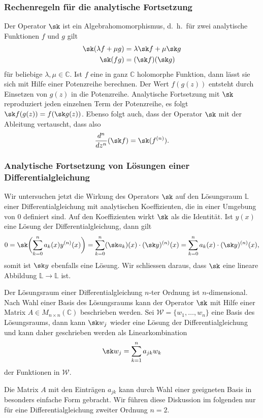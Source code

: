 \subsubsection{Rechenregeln für die analytische Fortsetzung}
Der Operator $\sk$ ist ein Algebrahomomorphismus, d.~h.~für zwei analytische
Funktionen $f$ und $g$ gilt
\[
\begin{aligned}
\sk(\lambda f + \mu g)
&=
\lambda \sk f  + \mu \sk g
\\
\sk(fg)
&=
(\sk f)(\sk g)
\end{aligned}
\]
für beliebige $\lambda,\mu\in\mathbb{C}$.
Ist $f$ eine in ganz $\mathbb{C}$ holomorphe Funktion, dann lässt sie
sich mit Hilfe einer Potenzreihe berechnen.
Der Wert $f(g(z))$ entsteht durch Einsetzen von $g(z)$ in die Potenzreihe.
Analytische Fortsetzung mit $\sk$ reproduziert jeden einzelnen Term
der Potenzreihe, es folgt
$\sk f(g(z)) = f(\sk g(z))$.
Ebenso folgt auch, dass der Operator $\sk$ mit der Ableitung
vertauscht, dass also
\[
\frac{d^n}{dz^n}(\sk f)
=
\sk(f^{(n)}).
\]


\subsubsection{Analytische Fortsetzung von Lösungen einer Differentialgleichung}
Wir untersuchen jetzt die Wirkung des Operators $\sk$ auf
den Lösungsraum $\mathbb{L}$ einer Differentialgleichung mit
analytischen Koeffizienten, die in einer Umgebung von $0$
definiert sind.
Auf den Koeffizienten wirkt $\sk$ als die Identität. 
Ist $y(x)$ eine Lösung der Differentialgleichung, dann gilt
\[
0
=
\sk\biggl(
\sum_{k=0}^n a_k(x) y^{(n)}(x)
\biggr)
=
\sum_{k=0}^n (\sk a_k)(x) \cdot (\sk y)^{(n)}(x)
=
\sum_{k=0}^n a_k(x) \cdot (\sk y)^{(n)}(x),
\]
somit ist $\sk y$ ebenfalls eine Lösung.
Wir schliessen daraus, dass $\sk$ eine lineare Abbildung 
$\mathbb{L}\to\mathbb{L}$ ist.

Der Lösungsraum einer Differentialgleichung $n$-ter Ordnung
ist $n$-dimensional.
Nach Wahl einer Basis des Lösungsraums kann der Operator $\sk$
mit Hilfe einer Matrix $A\in M_{n\times n}(\mathbb{C})$ beschrieben werden.
Sei $\mathscr{W}=\{w_1,\dots,w_n\}$ eine Basis des Lösungsraums, dann
kann $\sk w_j$ wieder eine Lösung der Differentialgleichung
und kann daher geschrieben werden als Linearkombination
\begin{equation}
\sk w_j
=
\sum_{k=1}^n
a_{jk} w_k
\end{equation}
der Funktionen in $\mathscr{W}$.

Die Matrix $A$ mit den Einträgen $a_{jk}$ kann durch Wahl einer
geeigneten Basis in besonders einfache Form gebracht.
Wir führen diese Diskussion im folgenden nur für eine Differentialgleichung
zweiter Ordnung $n=2$.


